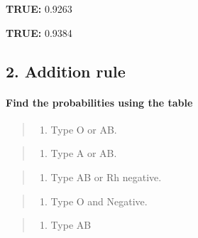 \documentclass[11pt]{article}
\providecommand{\tightlist}{%
      \setlength{\itemsep}{0pt}\setlength{\parskip}{0pt}}
\begin{document}
    \textbf{TRUE:} 0.9263

    
    \textbf{TRUE:} 0.9384

    
    \hypertarget{addition-rule}{%
\subsection{2. Addition rule}\label{addition-rule}}

\hypertarget{find-the-probabilities-using-the-table}{%
\paragraph{Find the probabilities using the
table}\label{find-the-probabilities-using-the-table}}

\begin{quote}
\begin{enumerate}
\def\labelenumi{\arabic{enumi}.}
\tightlist
\item
  Type O or AB.
\end{enumerate}
\end{quote}

\begin{quote}
\begin{enumerate}
\def\labelenumi{\arabic{enumi}.}
\setcounter{enumi}{1}
\tightlist
\item
  Type A or AB.
\end{enumerate}
\end{quote}

\begin{quote}
\begin{enumerate}
\def\labelenumi{\arabic{enumi}.}
\setcounter{enumi}{2}
\tightlist
\item
  Type AB or Rh negative.
\end{enumerate}
\end{quote}

\begin{quote}
\begin{enumerate}
\def\labelenumi{\arabic{enumi}.}
\setcounter{enumi}{3}
\tightlist
\item
  Type O and Negative.
\end{enumerate}
\end{quote}

\begin{quote}
\begin{enumerate}
\def\labelenumi{\arabic{enumi}.}
\setcounter{enumi}{4}
\tightlist
\item
  Type AB
\end{enumerate}
\end{quote}
\end{document}
